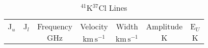 \begin{table*}[htp]
\centering
\caption{$^{41}$K$^{37}$Cl Lines}
\begin{tabular}{ccccccc}
\label{tab:41K37Cl_salt_lines}
 J$_u$ & J$_l$ & Frequency & Velocity & Width & Amplitude & E$_U$ \\
  &  & $\mathrm{GHz}$ & $\mathrm{km\,s^{-1}}$ & $\mathrm{km\,s^{-1}}$ & $\mathrm{K}$ & $\mathrm{K}$ \\
\hline
\hline
\end{tabular}

\par 
\end{table*}
